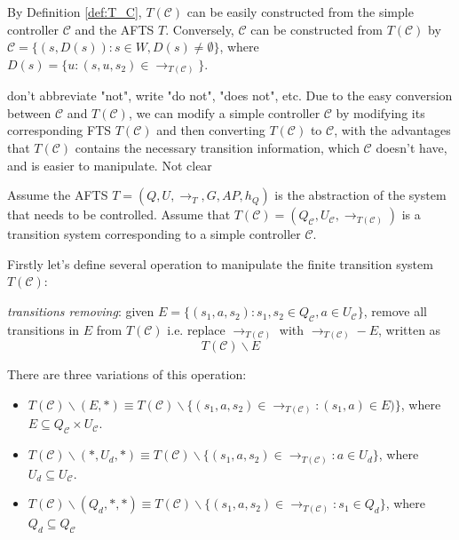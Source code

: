\begin{remark}
	By Definition \ref{def:T_C}, $ T(\mathcal{C}) $ can be easily constructed from the simple controller $ \mathcal{C} $ and the AFTS $ T $. Conversely, $ \mathcal{C} $ can be constructed from $ T(\mathcal{C}) $ by $ \mathcal{C} = \{(s,D(s)):s\in W,D(s)\not=\emptyset\} $, where $ D(s)=\{u:(s,u,s_2)\in \rightarrow_{T(\mathcal{C})}\} $.
\end{remark}
{\color{blue} don't abbreviate "not", write "do not", "does not", etc.}
Due to the easy conversion between  $ \mathcal{C} $ and $ T(\mathcal{C}) $, we can modify a simple controller $ \mathcal{C} $ by modifying its corresponding FTS $ T(\mathcal{C}) $ and then converting $ T(\mathcal{C}) $ to $ \mathcal{C} $, with the advantages that $ T(\mathcal{C}) $ contains the necessary transition information, which $ \mathcal{C} $ doesn't have, and is easier to manipulate. {\color{purple} Not clear}

Assume the AFTS $ T = (Q,U,\rightarrow_T, G, AP, h_Q) $ is the abstraction of the system that needs to be controlled. Assume that $ T(\mathcal{C})=(Q_{\mathcal{C}}, U_{\mathcal{C}},\rightarrow_{T(\mathcal{C})})$ is a transition system corresponding to a simple controller $ \mathcal{C} $. 

Firstly let's define several operation to manipulate the finite transition system $ T(\mathcal{C}) $:

\emph{transitions removing}: given $ E = \{(s_1,a,s_2): s_1,s_2\in Q_{\mathcal{C}}, a\in U_{\mathcal{C}}\} $, remove all transitions in $ E $ from $ T(\mathcal{C}) $ i.e. replace $ \rightarrow_{T(\mathcal{C})} $ with $\rightarrow_{T(\mathcal{C})} - E$, written as 
\begin{displaymath}
	T(\mathcal{C})\backslash E 
\end{displaymath}

There are three variations of this operation:
\begin{itemize}
	\item $ T(\mathcal{C}) \backslash (E,*) \equiv T(\mathcal{C})\backslash \{(s_1,a,s_2)\in \rightarrow_{T(\mathcal{C})}: (s_1,a)\in E)\}$, where $ E \subseteq Q_{\mathcal{C}}\times U_{\mathcal{C}} $.
	\item $ T(\mathcal{C}) \backslash (*,U_d,*) \equiv T(\mathcal{C})\backslash \{(s_1,a,s_2)\in \rightarrow_{T(\mathcal{C})}: a\in U_d \}$, where $ U_d\subseteq U_{\mathcal{C}} $.
	\item $ T(\mathcal{C}) \backslash (Q_d,*,*)\equiv T(\mathcal{C})\backslash \{ (s_1,a,s_2)\in \rightarrow_{T(\mathcal{C})}: s_1\in Q_d \}$, where $ Q_d \subseteq Q_{\mathcal{C}} $ 
\end{itemize}

